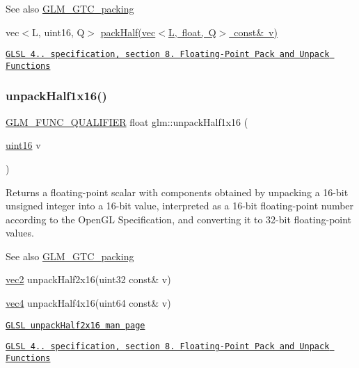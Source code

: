 \begin{DoxySeeAlso}{See also}
\mbox{\hyperlink{group__gtc__packing}{G\+L\+M\+\_\+\+G\+T\+C\+\_\+packing}} 

vec$<$\+L, uint16, Q$>$ \mbox{\hyperlink{group__gtc__packing_ga2d8bbce673ebc04831c1fb05c47f5251}{pack\+Half(vec$<$\+L, float, Q$>$ const\& v)}} 

\href{http://www.opengl.org/registry/doc/GLSLangSpec.4.20.8.pdf}{\tt G\+L\+SL 4.. specification, section 8. Floating-\/\+Point Pack and Unpack Functions} 
\end{DoxySeeAlso}
\mbox{\label{group__gtc__packing_gaa6eebcdfc746584b7d1823f1d5344fed}} 
\subsubsection{\texorpdfstring{unpack\+Half1x16()}{unpackHalf1x16()}}
{\footnotesize\ttfamily \mbox{\hyperlink{setup_8hpp_a33fdea6f91c5f834105f7415e2a64407}{G\+L\+M\+\_\+\+F\+U\+N\+C\+\_\+\+Q\+U\+A\+L\+I\+F\+I\+ER}} float glm\+::unpack\+Half1x16 (\begin{DoxyParamCaption}\item[{\mbox{\hyperlink{group__gtc__type__precision_gad8c2939e1fdd8e5828b31d95c52255d5}{uint16}}}]{v }\end{DoxyParamCaption})}

Returns a floating-\/point scalar with components obtained by unpacking a 16-\/bit unsigned integer into a 16-\/bit value, interpreted as a 16-\/bit floating-\/point number according to the Open\+GL Specification, and converting it to 32-\/bit floating-\/point values.

\begin{DoxySeeAlso}{See also}
\mbox{\hyperlink{group__gtc__packing}{G\+L\+M\+\_\+\+G\+T\+C\+\_\+packing}} 

\mbox{\hyperlink{group__core__types_gaa1618f51db67eaa145db101d8c8431d8}{vec2}} unpack\+Half2x16(uint32 const\& v) 

\mbox{\hyperlink{group__core__types_ga5881b1b022d7fd1b7218f5916532dd02}{vec4}} unpack\+Half4x16(uint64 const\& v) 

\href{http://www.opengl.org/sdk/docs/manglsl/xhtml/unpackHalf2x16.xml}{\tt G\+L\+SL unpack\+Half2x16 man page} 

\href{http://www.opengl.org/registry/doc/GLSLangSpec.4.20.8.pdf}{\tt G\+L\+SL 4.. specification, section 8. Floating-\/\+Point Pack and Unpack Functions} 
\end{DoxySeeAlso}
\mbox{\label{group__gtc__packing_gaea526d6491ad40401eac34803984bf27}} 
